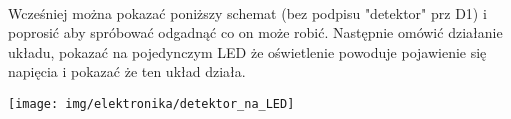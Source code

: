 \documentclass{pdfBooklets}
\begin{document}
% 

\begin{teacherOnly}
\noindent\begin{minipage}[t]{0.6\textwidth}
\\
Wcześniej można pokazać poniższy schemat (bez podpisu "detektor" prz D1) i poprosić aby spróbować odgadnąć co on może robić.
Następnie omówić działanie układu, pokazać na pojedynczym LED że oświetlenie powoduje pojawienie się napięcia i pokazać że ten układ działa.
\end{minipage}
\hfill
\begin{minipage}[t]{0.35\textwidth}
\vspace{-10pt}
\texttt{[image: img/elektronika/detektor\_na\_LED]}
\end{minipage}
\end{teacherOnly}

\clearpage
\end{document}
